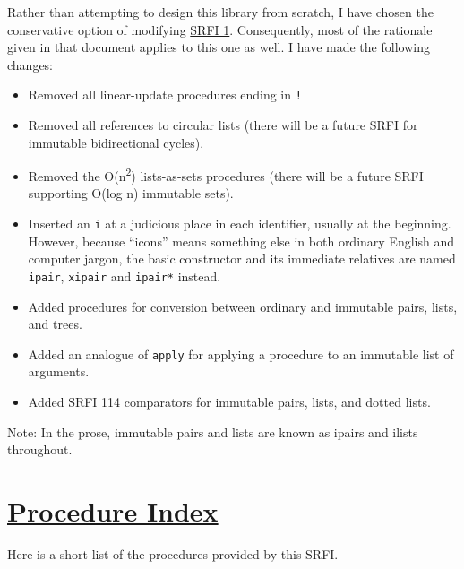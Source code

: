 Rather than attempting to design this library from scratch, I have
chosen the conservative option of modifying
\href{http://srfi.schemers.org/srfi-1/srfi-1.html}{SRFI 1}.
Consequently, most of the rationale given in that document applies to
this one as well. I have made the following changes:

\begin{itemize}
\tightlist
\item
  Removed all linear-update procedures ending in \texttt{!}
\item
  Removed all references to circular lists (there will be a future SRFI
  for immutable bidirectional cycles).
\item
  Removed the O(n\textsuperscript{2}) lists-as-sets procedures (there
  will be a future SRFI supporting O(log n) immutable sets).
\item
  Inserted an \texttt{i} at a judicious place in each identifier,
  usually at the beginning. However, because ``icons'' means something
  else in both ordinary English and computer jargon, the basic
  constructor and its immediate relatives are named \texttt{ipair},
  \texttt{xipair} and \texttt{ipair*} instead.
\item
  Added procedures for conversion between ordinary and immutable pairs,
  lists, and trees.
\item
  Added an analogue of \texttt{apply} for applying a procedure to an
  immutable list of arguments.
\item
  Added SRFI 114 comparators for immutable pairs, lists, and dotted
  lists.
\end{itemize}

Note: In the prose, immutable pairs and lists are known as ipairs and
ilists throughout.

\section{\texorpdfstring{\href{}{Procedure
Index}}{Procedure Index}}\label{procedure-index}

Here is a short list of the procedures provided by this SRFI.

